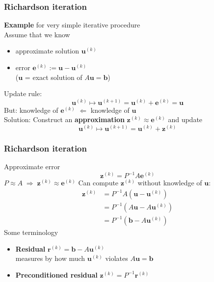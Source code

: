 \documentclass{beamer}
\begin{document}

\begin{frame}
  \frametitle{Richardson iteration}
  \textbf{Example} for very simple iterative procedure\\[1ex]
  Assume that we know
  \begin{itemize}
  \item approximate solution $\boldsymbol{u}^{(k)}$
  \item error $\boldsymbol{e}^{(k)} := \boldsymbol{u}-\boldsymbol{u}^{(k)}$\\
  {\footnotesize($\boldsymbol{u}$ = exact solution of $A\boldsymbol{u}=\boldsymbol{b}$)}
  \end{itemize}
  Update rule:
  $$
  \boldsymbol{u}^{(k)} \mapsto \boldsymbol{u}^{(k+1)} = \boldsymbol{u}^{(k)} + \boldsymbol{e}^{(k)} = \boldsymbol{u}
  $$
  But: knowledge of $\boldsymbol{e}^{(k)}$ $\Leftarrow$ knowledge of $\boldsymbol{u}$\\[2ex]
  Solution: Construct an \textbf{approximation} $\boldsymbol{z}^{(k)} \approx \boldsymbol{e}^{(k)}$ and update
  $$
  \boldsymbol{u}^{(k)} \mapsto \boldsymbol{u}^{(k+1)} = \boldsymbol{u}^{(k)} + \boldsymbol{z}^{(k)}
  $$
\end{frame}


\begin{frame}
  \frametitle{Richardson iteration}
  Approximate error 
$$
\boldsymbol{z}^{(k)} = P^{-1} A \boldsymbol{e}^{(k)}
$$
$P\approx A\;\Rightarrow\;\boldsymbol{z}^{(k)} \approx \boldsymbol{e}^{(k)}$
Can compute $\boldsymbol{z}^{(k)}$ without knowledge of $\boldsymbol{u}$:
$$
\begin{aligned}
\boldsymbol{z}^{(k)} &= P^{-1} A (\boldsymbol{u}-\boldsymbol{u}^{(k)})\\
&= P^{-1}(A\boldsymbol{u}-A\boldsymbol{u}^{(k)})\\
&= P^{-1}(\boldsymbol{b}-A\boldsymbol{u}^{(k)})
\end{aligned}
$$
Some terminology
\begin{itemize}
  \item \textbf{Residual} $\boldsymbol{r}^{(k)}=\boldsymbol{b}-A\boldsymbol{u}^{(k)}$\\
  {\footnotesize measures by how much $\boldsymbol{u}^{(k)}$ violates $A\boldsymbol{u}=\boldsymbol{b}$}
  \item \textbf{Preconditioned residual} $\boldsymbol{z}^{(k)}=P^{-1}\boldsymbol{r}^{(k)}$
\end{itemize}
\end{frame}
\end{document}
